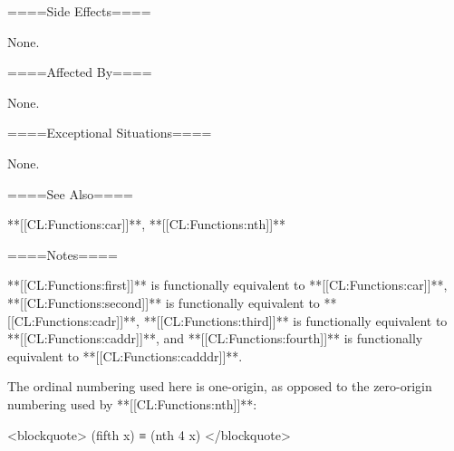 ====Side Effects====

None.

====Affected By====

None.

====Exceptional Situations====

None.

====See Also====

**[[CL:Functions:car]]**, **[[CL:Functions:nth]]**

====Notes====

**[[CL:Functions:first]]** is functionally equivalent to **[[CL:Functions:car]]**, **[[CL:Functions:second]]** is functionally equivalent to **[[CL:Functions:cadr]]**, **[[CL:Functions:third]]** is functionally equivalent to **[[CL:Functions:caddr]]**, and **[[CL:Functions:fourth]]** is functionally equivalent to **[[CL:Functions:cadddr]]**.

The ordinal numbering used here is one-origin, as opposed to the zero-origin numbering used by **[[CL:Functions:nth]]**:

<blockquote> (fifth x) ≡ (nth 4 x) </blockquote>

